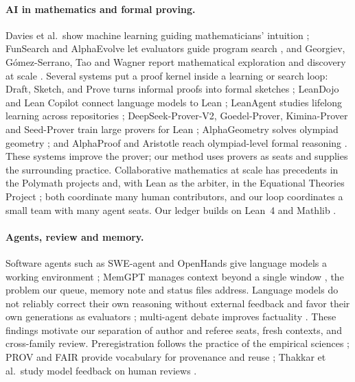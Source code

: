 \documentclass[11pt]{article}
\begin{document}
\paragraph{AI in mathematics and formal proving.} Davies et al.\ show machine
learning guiding mathematicians' intuition \citep{davies}; FunSearch and
AlphaEvolve let evaluators guide program search \citep{funsearch,alphaevolve},
and Georgiev, G\'omez-Serrano, Tao and Wagner report mathematical
exploration and discovery at scale \citep{georgiev}. Several systems
put a proof kernel inside a learning or search loop: Draft, Sketch, and Prove
turns informal proofs into formal sketches \citep{dsp}; LeanDojo and Lean
Copilot connect language models to Lean \citep{leandojo,leancopilot};
LeanAgent studies lifelong learning across repositories \citep{leanagent};
DeepSeek-Prover-V2, Goedel-Prover, Kimina-Prover and Seed-Prover train
large provers for Lean \citep{deepseekprover2,goedel,kimina,seedprover};
AlphaGeometry solves olympiad geometry \citep{alphageometry}; and AlphaProof
and Aristotle reach olympiad-level formal reasoning
\citep{alphaproof,aristotle}. These systems improve the prover; our method
uses provers as seats and supplies the surrounding practice. Collaborative
mathematics at scale has precedents in the Polymath projects
\citep{polymath} and, with Lean as the arbiter, in the Equational Theories
Project \citep{etp}; both coordinate many human contributors, and our loop
coordinates a small team with many agent seats. Our ledger builds on Lean~4
and Mathlib \citep{lean4,mathlib}.

\paragraph{Agents, review and memory.} Software agents such as SWE-agent and
OpenHands give language models a working environment
\citep{sweagent,openhands}; MemGPT manages context beyond a single window
\citep{memgpt}, the problem our queue, memory note and status files address.
Language models do not reliably correct their own reasoning without external
feedback \citep{huang} and favor their own generations as evaluators
\citep{panickssery}; multi-agent debate improves factuality
\citep{du}. These findings motivate our separation of author and referee
seats, fresh contexts, and cross-family review. Preregistration follows the
practice of the empirical sciences \citep{nosek}; PROV and FAIR provide
vocabulary for provenance and reuse \citep{prov,fair}; Thakkar et al.\ study
model feedback on human reviews \citep{thakkar}.
\end{document}
